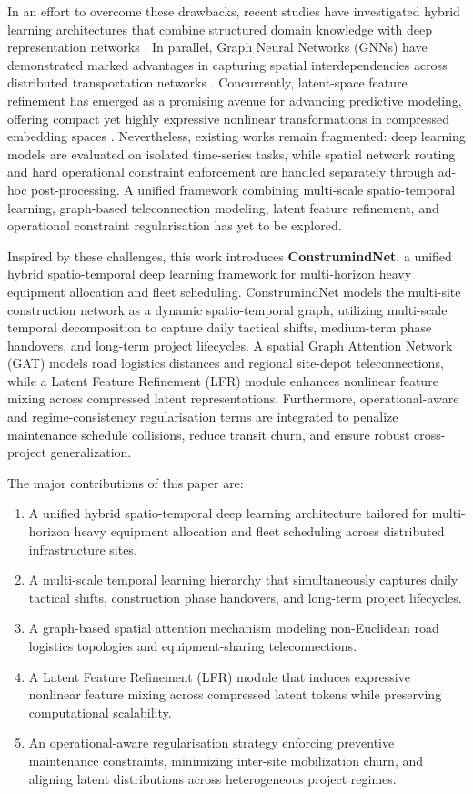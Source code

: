 \documentclass[11pt,a4paper]{article}
\begin{document}
In an effort to overcome these drawbacks, recent studies have investigated hybrid learning architectures that combine structured domain knowledge with deep representation networks \cite{meng2025,wang2025}. In parallel, Graph Neural Networks (GNNs) have demonstrated marked advantages in capturing spatial interdependencies across distributed transportation networks \cite{hussain2023,shin2023}. Concurrently, latent-space feature refinement has emerged as a promising avenue for advancing predictive modeling, offering compact yet highly expressive nonlinear transformations in compressed embedding spaces \cite{li2025,liu2025}. Nevertheless, existing works remain fragmented: deep learning models are evaluated on isolated time-series tasks, while spatial network routing and hard operational constraint enforcement are handled separately through ad-hoc post-processing. A unified framework combining multi-scale spatio-temporal learning, graph-based teleconnection modeling, latent feature refinement, and operational constraint regularisation has yet to be explored.

Inspired by these challenges, this work introduces \textbf{ConstrumindNet}, a unified hybrid spatio-temporal deep learning framework for multi-horizon heavy equipment allocation and fleet scheduling. ConstrumindNet models the multi-site construction network as a dynamic spatio-temporal graph, utilizing multi-scale temporal decomposition to capture daily tactical shifts, medium-term phase handovers, and long-term project lifecycles. A spatial Graph Attention Network (GAT) models road logistics distances and regional site-depot teleconnections, while a Latent Feature Refinement (LFR) module enhances nonlinear feature mixing across compressed latent representations. Furthermore, operational-aware and regime-consistency regularisation terms are integrated to penalize maintenance schedule collisions, reduce transit churn, and ensure robust cross-project generalization.

The major contributions of this paper are:
\begin{enumerate}
\item A unified hybrid spatio-temporal deep learning architecture tailored for multi-horizon heavy equipment allocation and fleet scheduling across distributed infrastructure sites.
\item A multi-scale temporal learning hierarchy that simultaneously captures daily tactical shifts, construction phase handovers, and long-term project lifecycles.
\item A graph-based spatial attention mechanism modeling non-Euclidean road logistics topologies and equipment-sharing teleconnections.
\item A Latent Feature Refinement (LFR) module that induces expressive nonlinear feature mixing across compressed latent tokens while preserving computational scalability.
\item An operational-aware regularisation strategy enforcing preventive maintenance constraints, minimizing inter-site mobilization churn, and aligning latent distributions across heterogeneous project regimes.
\end{enumerate}
\end{document}
